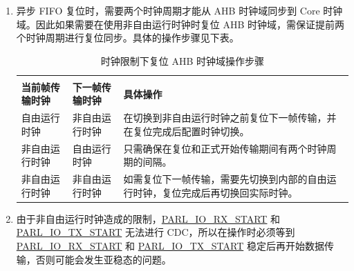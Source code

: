 \documentclass[main\_\_CN.tex]{subfiles}
\begin{document}
\begin{enumerate}
    \item 异步 FIFO 复位时，需要两个时钟周期才能从 AHB 时钟域同步到 Core 时钟域。因此如果需要在使用非自由运行时钟时复位 AHB 时钟域，需保证提前两个时钟周期进行复位同步。具体的操作步骤见下表。
    
\begin{table}[H]
    \centering
    \caption{时钟限制下复位 AHB 时钟域操作步骤}
    \label{tab:parlio-ahb-reset-clk-restriction}
    
    \begin{tabular}{|l|l|p{10cm}|}
    \hline
        \rowcolor{lightgray}
        \multicolumn{2}{|c|}{\textbf{时钟限制}} & \\
        \rowcolor{lightgray}
        \textbf{当前帧传输时钟} &\textbf{下一帧传输时钟} & \multirow{-2}{*}{\textbf{具体操作}}\\ \hline
    
        自由运行时钟    & 非自由运行时钟  & 在切换到非自由运行时钟之前复位下一帧传输，并在复位完成后配置时钟切换。    \\ \hline
        非自由运行时钟  & 自由运行时钟    & 只需确保在复位和正式开始传输期间有两个时钟周期的间隔。     \\ \hline
        非自由运行时钟  & 非自由运行时钟  & 如需复位下一帧传输，需要先切换到内部的自由运行时钟，复位完成后再切换回实际时钟。     \\ \hline
    \end{tabular}
\end{table}
    
    \item 由于非自由运行时钟造成的限制，\hyperref[fielddesc:PARLIORXSTART]{PARL\_IO\_RX\_START} 和 \hyperref[fielddesc:PARLIOTXSTART]{PARL\_IO\_TX\_START} 无法进行 CDC，所以在操作时必须等到 \hyperref[fielddesc:PARLIORXSTART]{PARL\_IO\_RX\_START} 和 \hyperref[fielddesc:PARLIOTXSTART]{PARL\_IO\_TX\_START} 稳定后再开始数据传输，否则可能会发生亚稳态的问题。
    

\end{enumerate}
\end{document}
